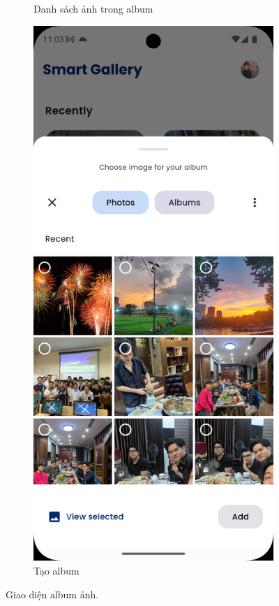 \begin{figure}[H]
\begin{subfigure}{0.32\textwidth}
        \caption{Danh sách ảnh trong album}
    \end{subfigure}
    \begin{subfigure}{0.32\textwidth}
        \includegraphics[width=1\linewidth]{figures/c4/4-2/create_album.png}
        \caption{Tạo album}
    \end{subfigure}
    \caption{Giao diện album ảnh.}
    \label{fig:album}
\end{figure}

